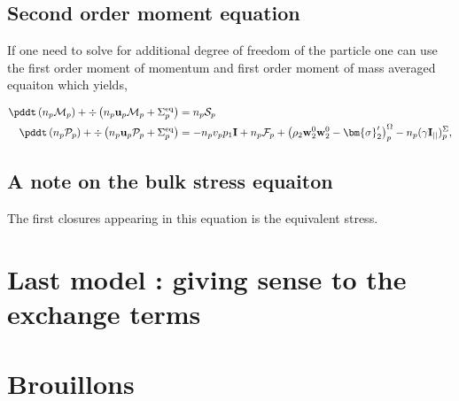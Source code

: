 \subsection*{Second order moment equation}

If one need to solve for additional degree of freedom of the particle one can use the first order moment of momentum and first order moment of mass averaged equaiton which yields, 

\begin{align}
    \pddt \left(n_p \mathcal{M}_p\right)
    + \div \left(
        n_p \textbf{u}_p \mathcal{M}_p
    + \Sigma_p^\text{eq}
    \right)
    &=
    n_p \mathcal{S}_p\\
    \pddt \left(n_p \mathcal{P}_p\right)
    + \div \left(
        n_p \textbf{u}_p \mathcal{P}_p
    + \Sigma_p^\text{eq}
    \right)
    &=
    -n_p v_p p_1 \textbf{I}
    + n_p \mathcal{F}_p
    + \left(
        \rho_2 \textbf{w}_2^0  \textbf{w}_2^0 
        - \bm{\sigma}_2'
    \right)^\Omega_p
    - n_p (\gamma \textbf{I}_{||})^\Sigma_p,
\end{align}

\subsection{A note on the bulk stress equaiton}
The first closures appearing in this equation is the equivalent stress. 

\section*{Last model : giving sense to the exchange terms}





\section*{Brouillons }

